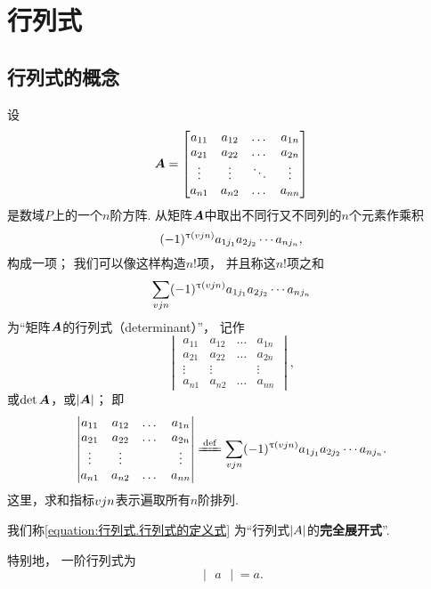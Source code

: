 \section{行列式}
\subsection{行列式的概念}
\begin{definition}
设
\[
\boldsymbol{A} = \begin{bmatrix}
a_{11} & a_{12} & \dots & a_{1n} \\
a_{21} & a_{22} & \dots & a_{2n} \\
\vdots & \vdots & \ddots & \vdots \\
a_{n1} & a_{n2} & \dots & a_{nn}
\end{bmatrix}
\]
是数域\(P\)上的一个\(n\)阶方阵.
从矩阵\(\boldsymbol{A}\)中取出不同行又不同列的\(n\)个元素作乘积
\begin{equation}\label{equation:行列式.行列式的项1}
	(-1)^{\uptau(v{j}{n})}
	a_{1 j_1} a_{2 j_2} \dotsm a_{n j_n},
\end{equation}
构成一项；%
我们可以像这样构造\(n!\)项，%
并且称这\(n!\)项之和\[
\sum\limits_{v{j}{n}}
(-1)^{\uptau(v{j}{n})}
a_{1 j_1} a_{2 j_2} \dotsm a_{n j_n}
\]为“矩阵\(\boldsymbol{A}\)的行列式（determinant）”，%
记作\[
\begin{vmatrix}
a_{11} & a_{12} & \dots & a_{1n} \\
a_{21} & a_{22} & \dots & a_{2n} \\
\vdots & \vdots & & \vdots \\
a_{n1} & a_{n2} & \dots & a_{nn}
\end{vmatrix},
\]或\(\det\boldsymbol{A}\)，或\(\abs{\boldsymbol{A}}\)；
即
\begin{equation}\label{equation:行列式.行列式的定义式}
\begin{vmatrix}
a_{11} & a_{12} & \dots & a_{1n} \\
a_{21} & a_{22} & \dots & a_{2n} \\
\vdots & \vdots & & \vdots \\
a_{n1} & a_{n2} & \dots & a_{nn}
\end{vmatrix}
\defeq
\sum\limits_{\v{j}{n}}
(-1)^{\tau(\v{j}{n})}
a_{1 j_1} a_{2 j_2} \dotsm a_{n j_n}.
\end{equation}
这里，求和指标\(v{j}{n}\)表示遍取所有\(n\)阶排列.

我们称\cref{equation:行列式.行列式的定义式}
为“行列式\(\abs{A}\)的\textbf{完全展开式}”.
\end{definition}

特别地，%
一阶行列式为
\begin{equation}
	\begin{vmatrix} a \end{vmatrix} = a.
\end{equation}

